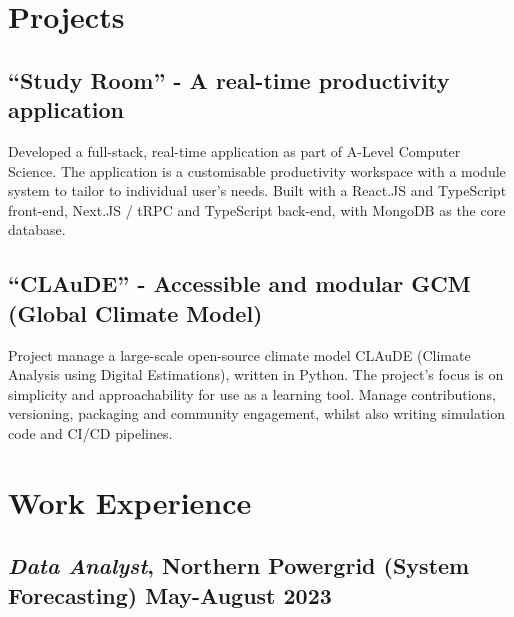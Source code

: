 \documentclass[9pt]{extarticle}
\begin{document}
\begin{minipage}{0.65\textwidth}
	\raggedright
	\section{Projects}
	\subsection{``Study Room'' - A real-time productivity application}
	Developed a full-stack, real-time application as part of A-Level Computer Science.
	The application is a customisable productivity workspace with a module system to tailor to individual user's needs.
	Built with a React.JS and TypeScript front-end, Next.JS / tRPC and TypeScript back-end, with MongoDB as the core database.
	\vspace{.3cm}

	\subsection{``CLAuDE'' - Accessible and modular GCM (Global Climate Model)}
	Project manage a large-scale open-source climate model CLAuDE (Climate Analysis using Digital Estimations), written in Python.
	The project's focus is on simplicity and approachability for use as a learning tool.
	Manage contributions, versioning, packaging and community engagement, whilst also writing simulation code and CI/CD pipelines.

	\vspace{.3cm}
	\section{Work Experience}

	\subsection{\textit{Data Analyst}, Northern Powergrid (System Forecasting) \hfill May-August 2023}


\end{minipage}
\end{document}
